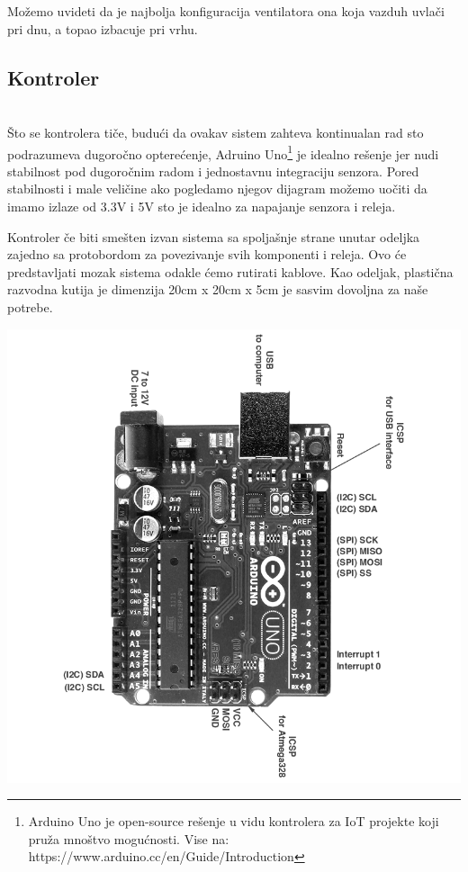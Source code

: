 \documentclass[a4paper,11pt]{book}
\begin{document}
Možemo uvideti da je najbolja konfiguracija ventilatora ona koja vazduh uvlači pri dnu, a topao izbacuje pri vrhu. 

\subsection{Kontroler}
\noindent \\ Što se kontrolera tiče, budući da ovakav sistem zahteva kontinualan rad sto podrazumeva dugoročno opterećenje, Adruino Uno\footnote{Arduino Uno je open-source rešenje u vidu kontrolera za IoT projekte koji pruža mnoštvo mogućnosti. Vise na: https://www.arduino.cc/en/Guide/Introduction} je idealno rešenje jer nudi stabilnost pod dugoročnim radom i jednostavnu integraciju senzora. Pored stabilnosti i male veličine ako pogledamo njegov dijagram možemo uočiti da imamo izlaze od 3.3V i 5V sto je idealno za napajanje senzora i releja.

Kontroler če biti smešten izvan sistema sa spoljašnje strane unutar odeljka zajedno sa protobordom za povezivanje svih komponenti i releja. Ovo će predstavljati mozak sistema odakle ćemo rutirati kablove. Kao odeljak, plastična razvodna kutija je dimenzija 20cm x 20cm x 5cm je sasvim dovoljna za naše potrebe.

\includegraphics[width=\textwidth]{uno_pinout.png}
\end{document}
